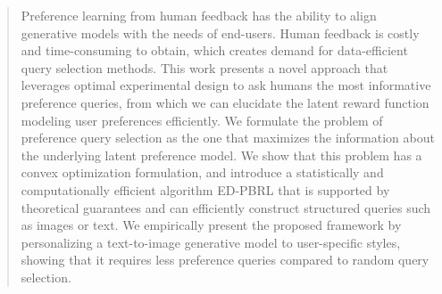 \documentclass{article}
\begin{document}

\printAffiliationsAndNotice{}

\begin{abstract}
Preference learning from human feedback has the ability to align generative models with the needs of end-users. Human feedback is costly and time-consuming to obtain, which creates demand for data-efficient query selection methods. This work presents a novel approach that leverages optimal experimental design to ask humans the most informative preference queries, from which we can elucidate the latent reward function modeling user preferences efficiently. We formulate the problem of preference query selection as the one that maximizes the information about the underlying latent preference model. We show that this problem has a convex optimization formulation, and introduce a statistically and computationally efficient algorithm ED-PBRL that is supported by theoretical guarantees and can efficiently construct structured queries such as images or text. We empirically present the proposed framework by personalizing a text-to-image generative model to user-specific styles, showing that it requires less preference queries compared to random query selection.
\end{abstract}
\end{document}
